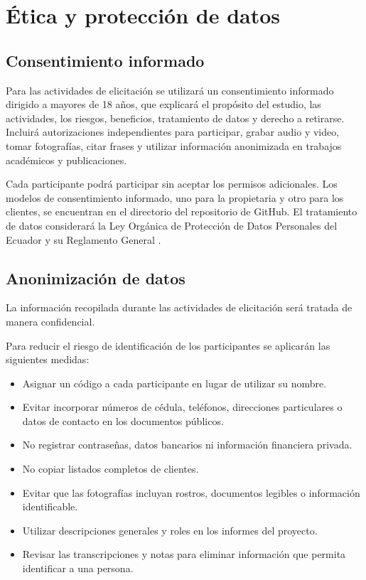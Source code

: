 \documentclass[11pt,a4paper]{article}
\begin{document}
	
	\section{Ética y protección de datos}
	
	\subsection{Consentimiento informado}
	
	Para las actividades de elicitación se utilizará un consentimiento informado dirigido a mayores de 18 años, que explicará el propósito del estudio, las actividades, los riesgos, beneficios, tratamiento de datos y derecho a retirarse. Incluirá autorizaciones independientes para participar, grabar audio y video, tomar fotografías, citar frases y utilizar información anonimizada en trabajos académicos y publicaciones.
	
	Cada participante podrá participar sin aceptar los permisos adicionales. Los modelos de consentimiento informado, uno para la propietaria y otro para los clientes, se encuentran en el directorio  del repositorio de GitHub. El tratamiento de datos considerará la Ley Orgánica de Protección de Datos Personales del Ecuador \cite{lopdp2021} y su Reglamento General \cite{reglamentolopdp2023}.
	
	\subsection{Anonimización de datos}
	
	La información recopilada durante las actividades de elicitación será tratada de manera confidencial.
	
	Para reducir el riesgo de identificación de los participantes se aplicarán las siguientes medidas:
	
	\begin{itemize}
		\item Asignar un código a cada participante en lugar de utilizar su nombre.
		\item Evitar incorporar números de cédula, teléfonos, direcciones particulares o datos de contacto en los documentos públicos.
		\item No registrar contraseñas, datos bancarios ni información financiera privada.
		\item No copiar listados completos de clientes.
		\item Evitar que las fotografías incluyan rostros, documentos legibles o información identificable.
		\item Utilizar descripciones generales y roles en los informes del proyecto.
		\item Revisar las transcripciones y notas para eliminar información que permita identificar a una persona.
	\end{itemize}
	
\end{document}
